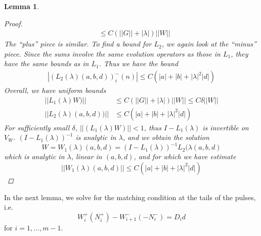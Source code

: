 \documentclass[12pt]{article}
\newtheorem{lemma}{Lemma}
\begin{document}
\begin{lemma}
\begin{proof}
\begin{align*}
&\leq C (||G|| + |\lambda|)||W||
\end{align*}
The ``plus'' piece is similar. To find a bound for $L_2$, we again look at the ``minus'' piece. Since the sums involve the same evolution operators as those in $L_1$, they have the same bounds as in $L_1$. Thus we have the bound
\begin{align*}
|(L_2(\lambda)(a,b,d))_i^-(n)| \leq C\left( |a| + |b| + |\lambda|^2 |d| \right)
\end{align*}
Overall, we have uniform bounds
\begin{align*}
||L_1(\lambda)W)|| &\leq C \left(||G|| + |\lambda| \right)||W|| \leq C \delta ||W|| \\
||L_2(\lambda)(a,b,d))|| &\leq C\left( |a| + |b| + |\lambda|^2 |d| \right)
\end{align*}
For sufficiently small $\delta$, $||(L_1(\lambda)W)|| < 1$, thus $I - L_1(\lambda)$ is invertible on $V_W$. $(I - L_1(\lambda))^{-1}$ is analytic in $\lambda$, and we obtain the solution 
\[
W = W_1(\lambda)(a,b,d) = (I - L_1(\lambda))^{-1} L_2(\lambda(a,b,d)
\]
which is analytic in $\lambda$, linear in $(a, b, d)$, and for which we have estimate
\[
||W_1(\lambda)(a,b,d)|| \leq C \left( |a| + |b| + |\lambda|^2 |d| \right)
\]
\end{proof}
\end{lemma}

In the next lemma, we solve for the matching condition at the tails of the pulses, i.e.
\[
W_i^+(N_i^+) - W_{i+1}^-(-N_i^-) = D_i d
\]
for $i = 1, \dots, m-1$. 
\end{document}
